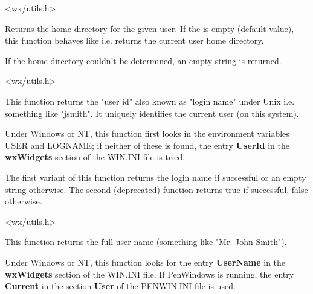 
<wx/utils.h>


\label{wxgetuserhome}


Returns the home directory for the given user. If the  is empty
(default value), this function behaves like 
 i.e. returns the current user home
directory.

If the home directory couldn't be determined, an empty string is returned.


<wx/utils.h>


\label{wxgetuserid}



This function returns the "user id" also known as "login name" under Unix i.e.
something like "jsmith". It uniquely identifies the current user (on this system).

Under Windows or NT, this function first looks in the environment
variables USER and LOGNAME; if neither of these is found, the entry {\bf UserId}\rtfsp
in the {\bf wxWidgets} section of the WIN.INI file is tried.

The first variant of this function returns the login name if successful or an
empty string otherwise. The second (deprecated) function returns true
if successful, false otherwise.




<wx/utils.h>


\label{wxgetusername}



This function returns the full user name (something like "Mr. John Smith").

Under Windows or NT, this function looks for the entry {\bf UserName}\rtfsp
in the {\bf wxWidgets} section of the WIN.INI file. If PenWindows
is running, the entry {\bf Current} in the section {\bf User} of
the PENWIN.INI file is used.

